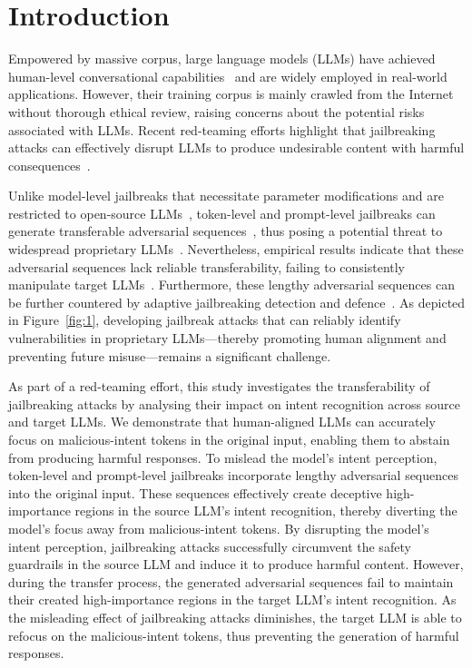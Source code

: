 \section{Introduction}
Empowered by massive corpus, large language models (LLMs) have achieved human-level conversational capabilities~\citep{openAI2023gpt, google2023an, llama3modelcard} and are widely employed in real-world applications.
However, their training corpus is mainly crawled from the Internet without thorough ethical review, raising concerns about the potential risks associated with LLMs.
Recent red-teaming efforts highlight that jailbreaking attacks can effectively disrupt LLMs to produce undesirable content with harmful consequences~\citep{perez2022red, ganguli2022red, ouyang2022training}.

Unlike model-level jailbreaks that necessitate parameter modifications and are restricted to open-source LLMs~\citep{qi2024fine, huang2023catastrophic}, token-level and prompt-level jailbreaks can generate transferable adversarial sequences~\citep{yu2023gptfuzzer, lapid2023open}, thus posing a potential threat to widespread proprietary LLMs~\citep{zou2023universal, chao2023jailbreaking}.
Nevertheless, empirical results indicate that these adversarial sequences lack reliable transferability, failing to consistently manipulate target LLMs~\citep{chao2024jailbreakbench, chen2024autobreach}.
Furthermore, these lengthy adversarial sequences can be further countered by adaptive jailbreaking detection and defence~\citep{alon2023detecting, inan2023llama, robey2023smoothllm, wangnoisegpt}.
As depicted in Figure~\ref{fig:1}, developing jailbreak attacks that can reliably identify vulnerabilities in proprietary LLMs—thereby promoting human alignment and preventing future misuse—remains a significant challenge.

As part of a red-teaming effort, this study investigates the transferability of jailbreaking attacks by analysing their impact on intent recognition across source and target LLMs.
We demonstrate that human-aligned LLMs can accurately focus on malicious-intent tokens in the original input, enabling them to abstain from producing harmful responses.
To mislead the model's intent perception, token-level and prompt-level jailbreaks incorporate lengthy adversarial sequences into the original input.
These sequences effectively create deceptive high-importance regions in the source LLM's intent recognition, thereby diverting the model's focus away from malicious-intent tokens.
By disrupting the model's intent perception, jailbreaking attacks successfully circumvent the safety guardrails in the source LLM and induce it to produce harmful content.
However, during the transfer process, the generated adversarial sequences fail to maintain their created high-importance regions in the target LLM's intent recognition.
As the misleading effect of jailbreaking attacks diminishes, the target LLM is able to refocus on the malicious-intent tokens, thus preventing the generation of harmful responses.

